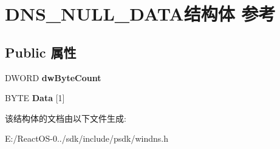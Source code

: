 \hypertarget{struct_d_n_s___n_u_l_l___d_a_t_a}{}\section{D\+N\+S\+\_\+\+N\+U\+L\+L\+\_\+\+D\+A\+T\+A结构体 参考}
\label{struct_d_n_s___n_u_l_l___d_a_t_a}
\subsection*{Public 属性}
\begin{DoxyCompactItemize}
\item 
\mbox{\label{struct_d_n_s___n_u_l_l___d_a_t_a_a6587f3b4c91c35efb31df279634ce2a0}} 
D\+W\+O\+RD {\bfseries dw\+Byte\+Count}
\item 
\mbox{\label{struct_d_n_s___n_u_l_l___d_a_t_a_aab774fa0bbeeede15eb47aa765c27641}} 
B\+Y\+TE {\bfseries Data} \mbox{[}1\mbox{]}
\end{DoxyCompactItemize}


该结构体的文档由以下文件生成\+:\begin{DoxyCompactItemize}
\item 
E\+:/\+React\+O\+S-\/0../sdk/include/psdk/windns.\+h\end{DoxyCompactItemize}
